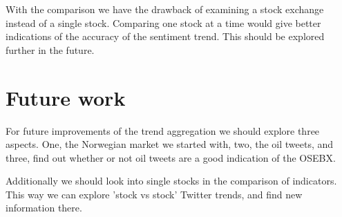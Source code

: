 With the comparison we have the drawback of examining a stock exchange instead
of a single stock. Comparing one stock at a time would give better indications of
the accuracy of the sentiment trend. This should be explored further in the
future.   
%

\section{Future work}
For future improvements of the trend aggregation we should explore three aspects.
One, the Norwegian market we started with, two, the oil tweets, and three, find
out whether or not oil tweets are a good indication of the OSEBX. 

Additionally we should look into single stocks in the comparison of indicators.
This way we can explore 'stock vs stock' Twitter trends, and find new information
there.
%

